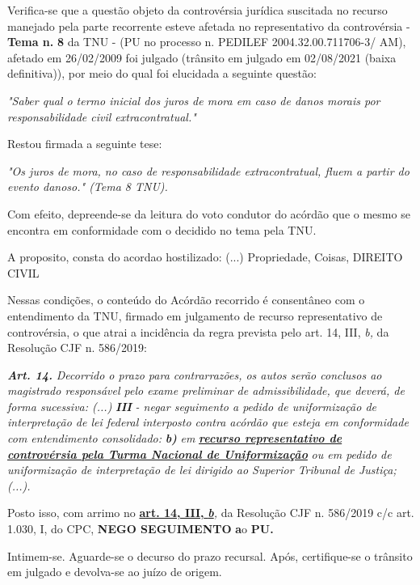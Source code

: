 \documentclass[12pt]{article}
\begin{document}
\justifying
\noindent Verifica-se que a questão objeto da controvérsia jurídica suscitada no recurso manejado pela parte recorrente esteve afetada no representativo da controvérsia - \textbf{Tema n. }\textbf{8} da TNU - (PU no processo n. PEDILEF 2004.32.00.711706-3/ AM),  afetado em 26/02/2009 foi julgado (trânsito em julgado em 02/08/2021 (baixa definitiva)), por meio do qual foi elucidada a seguinte questão:

\noindent \textit{"Saber qual o termo inicial dos juros de mora em caso de danos morais por responsabilidade civil extracontratual."}

\noindent Restou firmada a seguinte tese:

\noindent \textit{"Os juros de mora, no caso de responsabilidade extracontratual, fluem a partir do evento danoso." (Tema 8 TNU).}

\noindent Com efeito, depreende-se da leitura do voto condutor do acórdão que o mesmo se encontra em conformidade com o decidido no  tema pela TNU.

\noindent A proposito, consta do acordao hostilizado: (...) Propriedade, Coisas, DIREITO CIVIL

\noindent Nessas condições, o conteúdo do Acórdão recorrido é consentâneo com o entendimento da TNU, firmado em julgamento de recurso representativo de controvérsia, o que atrai a incidência da regra prevista pelo art. 14, III, \textit{b,} da Resolução CJF n. 586/2019:

\noindent \textit{\textbf{Art. 14.}}\textit{ Decorrido o prazo para contrarrazões, os autos serão conclusos ao magistrado responsável pelo exame preliminar de admissibilidade, que deverá, de forma sucessiva: (...) }\textit{\textbf{III }}\textit{- negar seguimento a pedido de uniformização de interpretação de lei federal interposto contra acórdão que esteja em conformidade com entendimento consolidado: }\textit{\textbf{b)}}\textit{ em }\uline{\textit{\textbf{recurso representativo de controvérsia pela Turma Nacional de Uniformização}}}\textit{ ou em pedido de uniformização de interpretação de lei dirigido ao Superior Tribunal de Justiça;(...).}

\noindent Posto isso, com arrimo no \uline{\textbf{art. 14, III, }}\uline{\textit{\textbf{b}}}\textit{,} da Resolução CJF n. 586/2019 c/c art. 1.030, I, do CPC, \textbf{NEGO SEGUIMENTO }\textbf{a}o\textbf{ PU}\textbf{.}

\noindent Intimem-se. Aguarde-se o decurso do prazo recursal. Após, certifique-se o trânsito em julgado e devolva-se ao juízo de origem.
\end{document}
